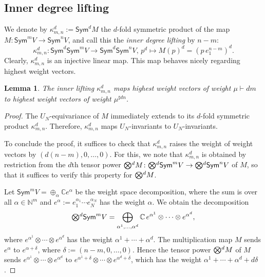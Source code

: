 \documentclass[11pt]{amsart}
\def\N{\mathbb{N}}
\def\C{\mathbb{C}}
\def\Sym{\mathsf{Sym}}
\def\ot{\otimes}
\newcommand{\tensor}{\smash{\textstyle\bigotimes}}
\numberwithin{equation}{section}
\newtheorem{lemma}[theorem]{Lemma}
\begin{document}
\subsection{Inner degree lifting}

We denote by $\kappa^d_{m,n} := \Sym^dM$ the $d$-fold symmetric product  
of the map 
$M\colon\Sym^m V \to \Sym^n V$,
and call this the {\em inner degree lifting} by $n-m$:
\begin{equation}\label{eq:SMe1}
 \kappa^d_{m,n}\colon \Sym^d\Sym^m V \to \Sym^d\Sym^n V,\, p^d \mapsto M(p)^d 
 = (p\, e_1^{n-m})^d .
\end{equation}
Clearly, $\kappa^d_{m,n}$ is an injective linear map. 
This map behaves nicely regarding highest weight vectors. 

\begin{lemma}\label{le:LNEW}
The inner lifting $\kappa^d_{m,n}$ maps 
highest weight vectors of weight $\mu\vdash dm$ 
to highest weight vectors of weight $\mu^{\sharp dn}$. %
\end{lemma}

\begin{proof}
The $U_N$-equivariance of $M$ immediately extends to its $d$-fold symmetric product $\kappa^d_{m,n}$. 
Therefore, $\kappa^d_{m,n}$ maps $U_N$-invariants to $U_N$-invariants. 

To conclude the proof, it suffices to check that $\kappa^d_{m,n}$ 
raises the weight of weight vectors by $(d(n-m),0,\ldots,0)$. 
For this, we note that $\kappa^d_{m,n}$ is obtained by restriction from 
the $d$th tensor power 
$\tensor^d M\colon \tensor^d\Sym^m V \to \tensor^d\Sym^n V$ of $M$, 
so that it suffices to verify this property for $\tensor^d M$.

Let $\Sym^m V = \oplus_\alpha \C e^\alpha$ be the weight space decomposition, where 
the sum is over all $\alpha\in\N^m$ and 
$e^\alpha := e_1^{\alpha_1}\cdots e_N^{\alpha_N}$
has the weight $\alpha$.  
We obtain the decomposition
$$
 \tensor^d \Sym^m V = \bigoplus_{\alpha^1,\ldots,\alpha^d} \C\, 
 e^{\alpha^1}\ot \cdots \ot e^{\alpha^d} ,
$$
where $e^{\alpha^1}\ot \cdots \ot e^{\alpha^d}$ has the weight $\alpha^1+\cdots+\alpha^d$.
The multiplication map $M$ sends $e^{\alpha}$ to 
$e^{\alpha+ \delta}$, where $\delta :=(n-m,0,\ldots,0)$.
Hence the tensor power $\tensor^d M$ of $M$ sends 
$e^{\alpha^1}\ot \cdots \ot e^{\alpha^d}$ to 
$e^{\alpha^1+\delta}\ot \cdots \ot e^{\alpha^d+\delta}$, 
which has the weight $\alpha^1+\cdots+\alpha^d+ d\delta$. 
\end{proof}
\end{document}
